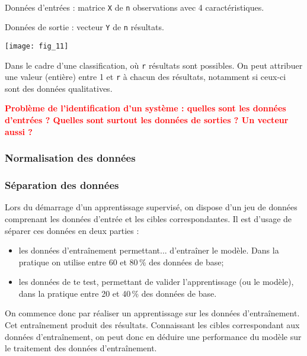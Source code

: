 \begin{exemple}~\\

Données d'entrées  : matrice  \texttt{X} de \texttt{n} observations avec 4 caractéristiques. 

Données de sortie : vecteur \texttt{Y} de \texttt{n} résultats. 
\begin{center}
\texttt{[image: fig\_11]}
\end{center}

Dans le cadre d'une classification, où \texttt{r} résultats sont possibles. On peut attribuer une valeur (entière) entre 1 et \texttt{r} à chacun des résultats, notamment si ceux-ci sont des données qualitatives.

\textcolor{red}{\textbf{Problème de l'identification d'un système : quelles sont les données d'entrées ? Quelles sont surtout les données de sorties ? Un vecteur aussi ?}}

\end{exemple}


\subsubsection{Normalisation des données}

\subsubsection{Séparation des données}

Lors du démarrage d'un apprentissage supervisé, on dispose d'un jeu de données comprenant les données d'entrée et les cibles correspondantes. Il est d'usage de séparer ces données en deux parties :
\begin{itemize}
\item les données d’entraînement permettant... d’entraîner le modèle. Dans la pratique on utilise entre 60 et 80\,\% des données de base;
\item les données de te test, permettant de valider l'apprentissage (ou le modèle), dans la pratique entre 20 et 40\,\% des données de base.
\end{itemize}

On commence donc par réaliser un apprentissage sur les données d’entraînement. Cet entraînement produit des résultats. Connaissant les cibles correspondant aux données d'entraînement, on peut donc en déduire une performance du modèle sur le traitement des données d’entraînement. 

